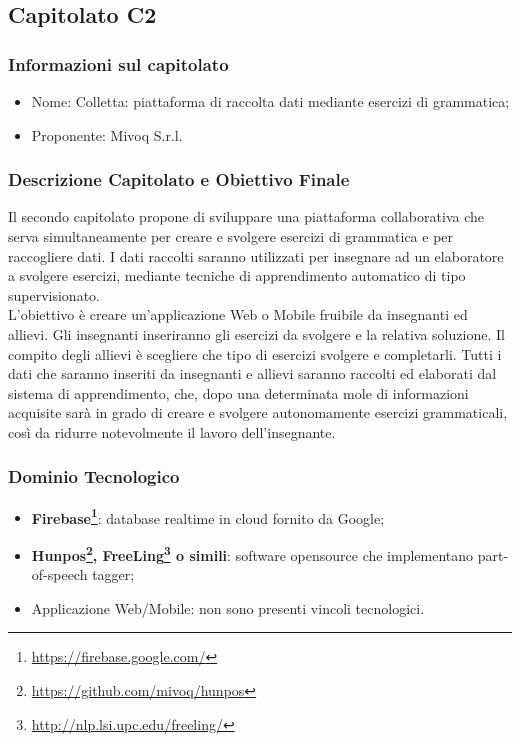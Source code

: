 \subsection{Capitolato C2}

\subsubsection{Informazioni sul capitolato}

\begin{itemize}
	\item Nome: Colletta: piattaforma di raccolta dati mediante esercizi di grammatica;
	\item Proponente: Mivoq S.r.l.
\end{itemize}

\subsubsection{Descrizione Capitolato e Obiettivo Finale}
Il secondo capitolato propone di sviluppare una piattaforma collaborativa che serva simultaneamente per 
creare e svolgere esercizi di grammatica e per raccogliere dati. I dati raccolti saranno utilizzati per insegnare ad un elaboratore a svolgere esercizi, mediante tecniche di apprendimento automatico di tipo supervisionato\glossario.\\
L'obiettivo è creare un'applicazione Web o Mobile fruibile da insegnanti ed allievi. Gli insegnanti inseriranno gli esercizi da svolgere e la relativa soluzione. Il compito degli allievi è scegliere che tipo di esercizi svolgere e completarli. Tutti i dati che saranno inseriti da insegnanti e allievi saranno raccolti ed elaborati dal sistema di apprendimento, che, dopo una determinata mole di informazioni acquisite sarà in grado di creare e svolgere autonomamente esercizi grammaticali, così da ridurre notevolmente il lavoro dell'insegnante.

\subsubsection{Dominio Tecnologico}
\begin{itemize}
	\item \textbf{Firebase\footnote{\hyperref[Link al sito]{https://firebase.google.com/}}}: database realtime in cloud fornito da Google;
	\item \textbf{Hunpos\footnote{\hyperref[Link al sito]{https://github.com/mivoq/hunpos}}, FreeLing\footnote{\hyperref[Link al sito]{http://nlp.lsi.upc.edu/freeling/}} o simili}: software opensource che implementano part-of-speech tagger\glossario;
	\item Applicazione Web/Mobile: non sono presenti vincoli tecnologici.
\end{itemize}

